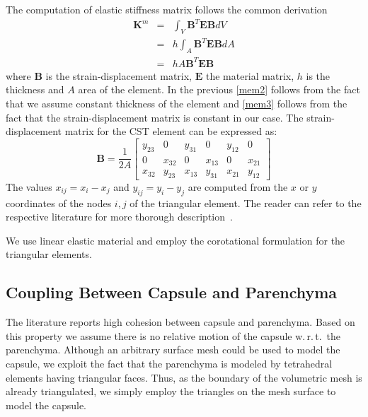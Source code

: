 \documentclass{llncs}
\def\wrt{w.\,r.\,t.}
\newcommand{\Mat}[1]{\mathbf{#1}}
\begin{document}
The computation of elastic stiffness matrix follows the common derivation
%
\begin{eqnarray}
  \Mat{K}^m & = & \int_V \Mat{B}^T \Mat{E} \Mat{B} dV     \label{mem1} \\
            & = & h \int_A \Mat{B}^T \Mat{E} \Mat{B} dA   \label{mem2} \\
            & = & h A \Mat{B}^T \Mat{E} \Mat{B}           \label{mem3}
\end{eqnarray}
%
where $\Mat{B}$ is the strain-displacement matrix, $\Mat{E}$ the material
matrix, $h$ is the thickness and $A$ area of the element. In the previous
\eqref{mem2} follows from the fact that we assume constant thickness of the
element and \eqref{mem3} follows from the fact that the strain-displacement
matrix is constant in our case. The strain-displacement matrix for the CST
element can be expressed as:
%
\begin{equation}
  \Mat{B} = \frac{1}{2A} \begin{bmatrix}
    y_{23} & 0      & y_{31} & 0      & y_{12} & 0 \\
         0 & x_{32} & 0      & x_{13} & 0      & x_{21} \\
    x_{32} & y_{23} & x_{13} & y_{31} & x_{21} & y_{12}
  \end{bmatrix}
\end{equation}
%
The values $x_{ij} = x_i - x_j$ and $y_{ij} = y_i - y_j$ are computed from
the $x$ or $y$ coordinates of the nodes $i,j$ of the triangular element.
The reader can refer to the respective literature for more thorough
description~\cite{Felippa2003}.

We use linear elastic material and employ the corotational formulation
for the triangular elements.


\subsection{Coupling Between Capsule and Parenchyma} %
The literature reports high cohesion between capsule and parenchyma.
Based on this property we assume there is no relative motion of the capsule \wrt\ the parenchyma.
Although an arbitrary surface mesh could be used to model the capsule, we exploit 
the fact that the parenchyma is modeled by tetrahedral elements having
triangular faces. Thus, as the boundary of the volumetric mesh is already
triangulated, we simply employ the triangles on the mesh surface to model the capsule.
\end{document}
